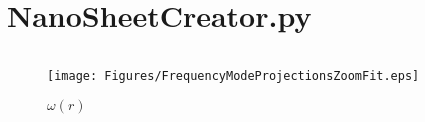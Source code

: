 
\appendix
\appendixpage
\addappheadtotoc
\section{NanoSheetCreator.py}
\label{NSCstart}
\inputminted[python3=true,bgcolor=Black,linenos=true]{python}{Listings/NanoSheetCreator.py}
\label{NSCend}
\begin{figure}
  \texttt{[image: Figures/FrequencyModeProjectionsZoomFit.eps]}
  \caption{$\omega(r)$}
  \label{OR}
\end{figure}
\newpage
